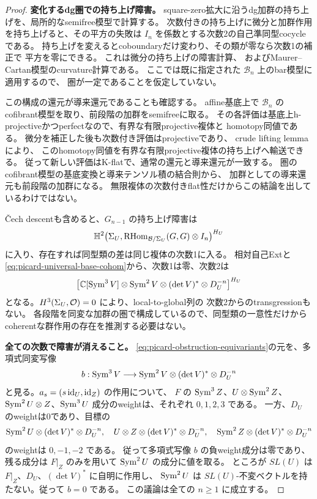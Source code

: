 \begin{proof}
\textbf{変化するdg圏での持ち上げ障害。}
square-zero拡大に沿うdg加群の持ち上げを、局所的なsemifree模型で計算する。
次数付きの持ち上げに微分と加群作用を持ち上げると、その平方の失敗は
$I_n$ を係数とする次数2の自己準同型cocycleである。
持ち上げを変えるとcoboundaryだけ変わり、その類が零なら次数1の補正で
平方を零にできる。
これは微分の持ち上げの障害計算\cite[Theorem 3.8]{LowenObstruction}、
およびMaurer--Cartan模型\cite[Proposition 7.1]{ELOI}のcurvature計算である。
ここでは既に指定された $\mathcal B_n$ 上のbar模型に適用するので、
圏が一定であることを仮定していない。

この構成の還元が導来還元であることも確認する。
affine基底上で $\mathcal B_n$ のcofibrant模型を取り、前段階の加群をsemifreeに取る。
その各評価は基底上h-projectiveかつperfectなので、有界な有限projective複体と
homotopy同値である。
微分を補正した後も次数付き評価はprojectiveであり、
crude lifting lemma\cite[Corollary 3.11]{LowenObstruction}により、
このhomotopy同値を有界な有限projective複体の持ち上げへ輸送できる。
従って新しい評価はK-flatで、通常の還元と導来還元が一致する。
圏のcofibrant模型の基底変換と導来テンソル積の結合則から、
加群としての導来還元も前段階の加群になる。
無限複体の次数付きflat性だけからこの結論を出しているわけではない。

\v Cech descentも含めると、$G_{n-1}$ の持ち上げ障害は
\[
 \mathbb H^2\bigl(\Sigma_U,
       \operatorname{RHom}_{\mathcal B/\Sigma_U}(G,G)\otimes I_n\bigr)^{H_U}
\]
に入り、存在すれば同型類の差は同じ複体の次数1に入る。
相対自己Extと\eqref{eq:picard-universal-base-cohom}から、次数1は零、次数2は
\begin{equation}\label{eq:picard-obstruction-equivariants}
 \left[\mathbb C[\operatorname{Sym}^3V]\otimes\operatorname{Sym}^2V\otimes(\det V)^*
                         \otimes D_U^{-n}\right]^{H_U}
\end{equation}
となる。$H^3(\Sigma_U,\mathcal O)=0$ により、local-to-global列の
次数2からのtransgressionもない。
各段階を同変な加群の圏で構成しているので、同型類の一意性だけから
coherentな群作用の存在を推測する必要はない。

\textbf{全ての次数で障害が消えること。}
\eqref{eq:picard-obstruction-equivariants}の元を、多項式同変写像
\[
 b:\operatorname{Sym}^3V\longrightarrow
       \operatorname{Sym}^2V\otimes(\det V)^*\otimes D_U^{-n}
\]
と見る。$a_s=(s\operatorname{id}_U,\operatorname{id}_Z)$ の作用について、
$F$ の $\operatorname{Sym}^3Z$、$U\otimes\operatorname{Sym}^2Z$、$\operatorname{Sym}^2U\otimes Z$、$\operatorname{Sym}^3U$
成分のweightは、それぞれ $0,1,2,3$ である。
一方、$D_U$ のweightは0であり、目標の
\[
 \operatorname{Sym}^2U\otimes(\det V)^*\otimes D_U^{-n},\quad
 U\otimes Z\otimes(\det V)^*\otimes D_U^{-n},\quad
 \operatorname{Sym}^2Z\otimes(\det V)^*\otimes D_U^{-n}
\]
のweightは $0,-1,-2$ である。
従って多項式写像 $b$ の負weight成分は零であり、残る成分は
$F|_Z$ のみを用いて $\operatorname{Sym}^2U$ の成分に値を取る。
ところが $SL(U)$ は $F|_Z$、$D_U$、$(\det V)^*$ に自明に作用し、
$\operatorname{Sym}^2U$ は $SL(U)$-不変ベクトルを持たない。従って $b=0$ である。
この議論は全ての $n\ge1$ に成立する。


\end{proof}

